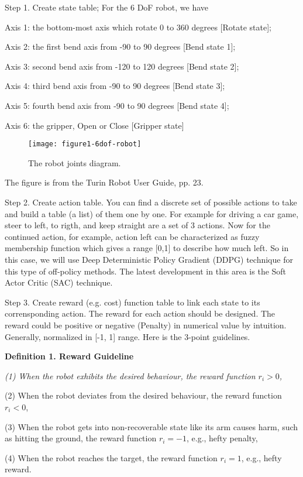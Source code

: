 \documentclass[conference]{IEEEtran}
\begin{document}
Step 1. Create state table; 
For the 6 DoF robot, we have 

{\footnotesize 
Axis 1: the bottom-most axis which rotate 0 to 360 degrees 
[Rotate state]; 

Axis 2: the first bend axis from -90 to 90 degrees [Bend 
state 1]; 

Axis 3: second bend axis from -120 to 120 degrees [Bend
state 2];

Axis 4: third bend axis from -90 to 90 degrees [Bend
state 3];

Axis 5: fourth bend axis from -90 to 90 degrees [Bend
state 4]; 

Axis 6: the gripper, Open or Close [Gripper state] 
} 
\begin{figure}[H] 
\centering
\texttt{[image: figure1-6dof-robot]} %
\caption{The robot joints diagram.}
\label{figure1-6dof-robot} 
\end{figure}
The figure is from the Turin Robot User Guide, pp. 23. 

Step 2. Create action table. You can 
find a discrete set of possible actions to take and build a 
table (a list) of them one by one. For example for driving 
a car game, steer to left, to rigth, and keep straight are
a set of 3 actions. Now for the continued action, for 
example, action left can be characterized as fuzzy membership
function which gives a range [0,1] to describe how much 
left. So in this case, we will use Deep Deterministic 
Policy Gradient (DDPG) technique for this type of
off-policy methods. The latest development in this area
is the Soft Actor Critic (SAC) technique. 

Step 3. Create reward (e.g. cost) function table to link each 
state to its corrensponding action. 
The reward for each action should be designed. 
The reward could be positive or negative (Penalty) in 
numerical value by intuition. Generally, normalized 
in [-1, 1] range. Here is the 3-point guidelines. 

{\bf Definition 1. Reward Guideline} 

{\it 
(1) When the robot exhibits the desired behaviour, 
the reward function $r_i > 0$, 

(2) When the robot deviates from the desired behaviour, 
the reward function $r_i < 0$,  

(3) When the robot gets into 
non-recoverable state like its arm causes harm, such as
hitting the ground, the reward function $r_i = -1$, 
e.g., hefty penalty, 

(4) When the robot reaches the target, 
the reward function $r_i = 1$, 
e.g., hefty reward.   
}
\end{document}
